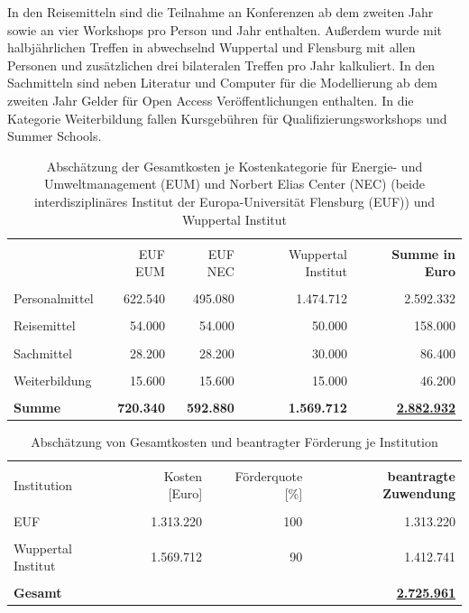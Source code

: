 \documentclass[a4paper,11pt,twoside]{scrartcl}
\begin{document}
In den Reisemitteln sind die Teilnahme an Konferenzen ab dem zweiten Jahr sowie an vier Workshops pro Person und Jahr enthalten. Außerdem wurde mit halbjährlichen Treffen in abwechselnd Wuppertal und Flensburg mit allen Personen und zusätzlichen drei bilateralen Treffen pro Jahr kalkuliert. In den Sachmitteln sind neben Literatur und Computer für die Modellierung ab dem zweiten Jahr Gelder für Open Access Veröffentlichungen enthalten. In die Kategorie Weiterbildung fallen Kursgebühren für Qualifizierungsworkshops und Summer Schools.

\begin{table}[h]
\begin{center}
  \caption{Abschätzung der Gesamtkosten je Kostenkategorie für Energie- und Umweltmanagement (EUM) und Norbert Elias Center (NEC) (beide interdisziplinäres Institut der Europa-Universität Flensburg (EUF)) und Wuppertal Institut}
\small  
\begin{tabular}[h]{|l | r | r | r | r|}
\hline
&&&&\\
& EUF EUM & EUF NEC & Wuppertal Institut & \textbf{Summe in Euro}\\
\hline
\hline
&&&&\\
 Personalmittel & 622.540 & 495.080 & 1.474.712 & 2.592.332\\
 \hline
 &&&&\\
 Reisemittel & 54.000 & 54.000 & 50.000 & 158.000\\
 \hline
 &&&&\\
 Sachmittel & 28.200 & 28.200 & 30.000 & 86.400\\
 \hline
 &&&&\\
 Weiterbildung & 15.600 & 15.600 & 15.000 & 46.200\\
 \hline
 \hline
 &&&&\\
 \textbf{Summe}& \textbf{720.340} & \textbf{592.880} & \textbf{1.569.712} & \underline{\textbf{2.882.932}}\\
 \hline
 \end{tabular}
 \label{tab:kostenkalkulation}
\end{center}
\end{table}

\begin{table}[h]
\small
\begin{center}
  \caption{Abschätzung von Gesamtkosten und beantragter Förderung je Institution}
\begin{tabular}[h]{|l | r | r | r|}
\hline
&&&\\
Institution & Kosten [Euro] & Förderquote [\%] & \textbf{beantragte Zuwendung}\\
\hline
\hline
 &&&\\
 EUF & 1.313.220 & 100 & 1.313.220\\
 \hline
 &&&\\
 Wuppertal Institut & 1.569.712 & 90 & 1.412.741
\\
 \hline
 \hline
 &&&\\
 \textbf{Gesamt} & & &\underline{\textbf{2.725.961}}\\
 \hline
 \end{tabular}
 \label{tab:kostenkalkulation2}
\end{center}
\end{table}
\end{document}

